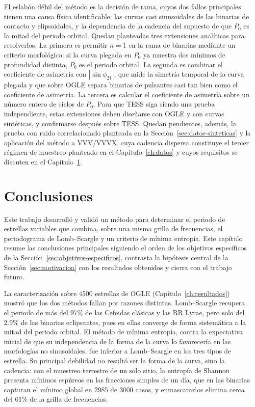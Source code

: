 \documentclass[12pt,letterpaper,oneside]{book}
\begin{document}
El eslab\'on d\'ebil del m\'etodo es la decisi\'on de rama, cuyos dos fallos principales tienen una causa f\'isica identificable: las curvas casi sinusoidales de las binarias de contacto y elipsoidales, y la dependencia de la cadencia del supuesto de que $P_0$ es la mitad del periodo orbital. Quedan planteadas tres extensiones anal\'iticas para resolverlos. La primera es permitir $n=1$ en la rama de binarias mediante un criterio morfol\'ogico: si la curva plegada en $P_0$ ya muestra dos m\'inimos de profundidad distinta, $P_0$ es el periodo orbital. La segunda es combinar el coeficiente de asimetr\'ia con $|\sin\phi_{21}|$, que mide la simetr\'ia temporal de la curva plegada y que sobre OGLE separa binarias de pulsantes casi tan bien como el coeficiente de asimetr\'ia. La tercera es calcular el coeficiente de asimetr\'ia sobre un n\'umero entero de ciclos de $P_0$. Para que TESS siga siendo una prueba independiente, estas extensiones deben dise\~narse con OGLE y con curvas sint\'eticas, y confirmarse despu\'es sobre TESS. Quedan pendientes, adem\'as, la prueba con ruido correlacionado planteada en la Secci\'on~\ref{sec:datos-sinteticas} y la aplicaci\'on del m\'etodo a VVV/VVVX, cuya cadencia dispersa constituye el tercer r\'egimen de muestreo planteado en el Cap\'itulo~\ref{ch:datos} y cuyos requisitos se discuten en el Cap\'itulo~\ref{ch:conclusiones}.

\chapter{Conclusiones}
\label{ch:conclusiones}

Este trabajo desarroll\'o y valid\'o un m\'etodo para determinar el periodo de estrellas variables que combina, sobre una misma grilla de frecuencias, el periodograma de Lomb--Scargle y un criterio de m\'inima entrop\'ia. Este cap\'itulo resume las conclusiones principales siguiendo el orden de los objetivos espec\'ificos de la Secci\'on~\ref{sec:objetivos-especificos}, contrasta la hip\'otesis central de la Secci\'on~\ref{sec:motivacion} con los resultados obtenidos y cierra con el trabajo futuro.

La caracterizaci\'on sobre 4500 estrellas de OGLE (Cap\'itulo~\ref{ch:resultados}) mostr\'o que los dos m\'etodos fallan por razones distintas. Lomb--Scargle recupera el periodo de m\'as del 97\% de las Cefeidas cl\'asicas y las RR Lyrae, pero solo del 2.9\% de las binarias eclipsantes, pues en ellas converge de forma sistem\'atica a la mitad del periodo orbital. El m\'etodo de m\'inima entrop\'ia, contra la expectativa inicial de que su independencia de la forma de la curva lo favorecer\'ia en las morfolog\'ias no sinusoidales, fue inferior a Lomb--Scargle en los tres tipos de estrella. Su principal debilidad no result\'o ser la forma de la curva, sino la cadencia: con el muestreo terrestre de un solo sitio, la entrop\'ia de Shannon presenta m\'inimos esp\'ureos en las fracciones simples de un d\'ia, que en las binarias capturan el m\'inimo global en 2985 de 3000 casos, y enmascararlos elimina cerca del 61\% de la grilla de frecuencias.
\end{document}
